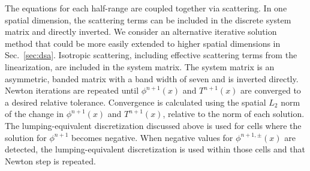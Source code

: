The equations for each half-range are coupled together via scattering.  
In one spatial dimension, the scattering terms can be included in the discrete system
matrix and directly inverted.  We consider an alternative iterative solution method that
could be more easily extended to higher spatial dimensions in Sec.~\ref{sec:dsa}.
Isotropic scattering,
including effective scattering terms from the linearization, are included in the system matrix. The system
matrix is an asymmetric, banded matrix with a band width of seven and is inverted
directly. 
Newton iterations are repeated until $\phi^{n+1}(x)$ and $T^{n+1}(x)$ are converged
to a desired relative tolerance.  Convergence is calculated using the spatial $L_2$
norm of the change in $\phi^{n+1}(x)$ and $T^{n+1}(x)$, relative to the norm of each
solution.  The lumping-equivalent discretization
discussed above is used for cells where the solution for
$\phi^{n+1}$ becomes negative. When negative values for $\phi^{n+1,\pm}(x)$ are detected, the lumping-equivalent discretization is used within
those cells and that Newton step is repeated. 


